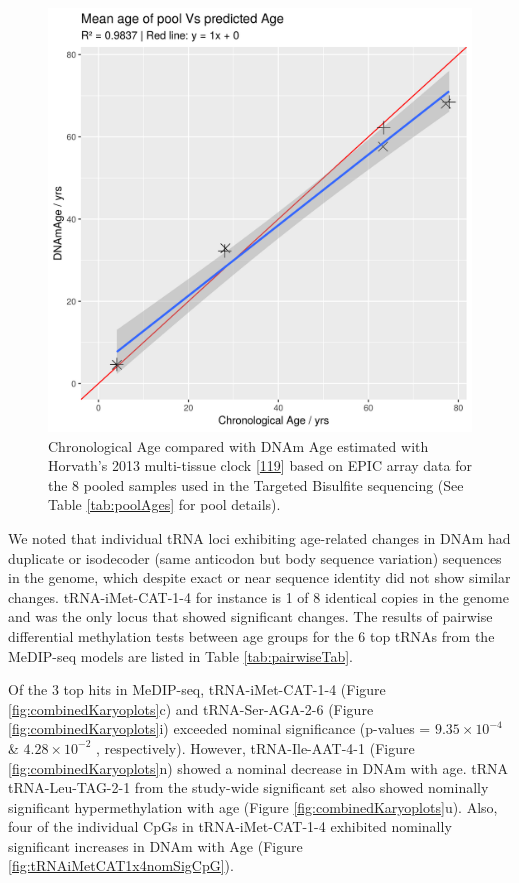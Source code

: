 \documentclass[
]{book}
\begin{document}
\begin{figure}

{\centering \includegraphics[width=0.6\linewidth]{./figs/DNAmAgeVsChronAge} 

}

\caption{Chronological Age compared with DNAm Age estimated with Horvath's 2013 multi-tissue clock {[}\protect\hyperlink{ref-Horvath2013}{119}{]} based on EPIC array data for the 8 pooled samples used in the Targeted Bisulfite sequencing (See Table \ref{tab:poolAges} for pool details).}\label{fig:DNAmAgeVsChronAge}
\end{figure}



We noted that individual tRNA loci exhibiting age-related changes in DNAm had duplicate or isodecoder (same anticodon but body sequence variation) sequences in the genome, which despite exact or near sequence identity did not show similar changes.
tRNA-iMet-CAT-1-4 for instance is 1 of 8 identical copies in the genome and was the only locus that showed significant changes.
The results of pairwise differential methylation tests between age groups for the 6 top tRNAs from the MeDIP-seq models are listed in Table \ref{tab:pairwiseTab}.

Of the 3 top hits in MeDIP-seq, tRNA-iMet-CAT-1-4 (Figure \ref{fig:combinedKaryoplots}c) and tRNA-Ser-AGA-2-6 (Figure \ref{fig:combinedKaryoplots}i) exceeded nominal significance (p-values = \(9.35\times10^{-4}\) \& \(4.28\times10^{-2}\) , respectively).
However, tRNA-Ile-AAT-4-1 (Figure \ref{fig:combinedKaryoplots}n) showed a nominal decrease in DNAm with age.
tRNA tRNA-Leu-TAG-2-1 from the study-wide significant set also showed nominally significant hypermethylation with age (Figure \ref{fig:combinedKaryoplots}u).
Also, four of the individual CpGs in tRNA-iMet-CAT-1-4 exhibited nominally significant increases in DNAm with Age (Figure \ref{fig:tRNAiMetCAT1x4nomSigCpG}).
\end{document}
